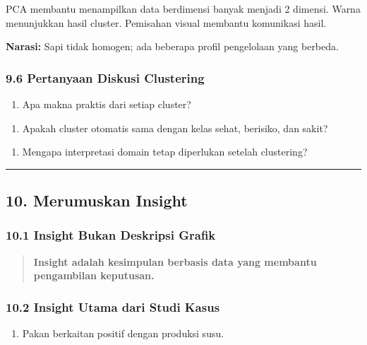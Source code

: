 \documentclass[12pt,a4paper]{article}
\begin{document}
PCA membantu menampilkan data berdimensi banyak menjadi 2 dimensi. Warna menunjukkan hasil cluster. Pemisahan visual membantu komunikasi hasil.


\textbf{Narasi:} Sapi tidak homogen; ada beberapa profil pengelolaan yang berbeda.


\subsubsection{9.6 Pertanyaan Diskusi Clustering}

\begin{enumerate}
\item Apa makna praktis dari setiap cluster?
\end{enumerate}

\begin{enumerate}
\item Apakah cluster otomatis sama dengan kelas sehat, berisiko, dan sakit?
\end{enumerate}

\begin{enumerate}
\item Mengapa interpretasi domain tetap diperlukan setelah clustering?
\end{enumerate}


\hrule


\subsection{10. Merumuskan Insight}

\subsubsection{10.1 Insight Bukan Deskripsi Grafik}

\begin{quote}
\textbf{Insight adalah kesimpulan berbasis data yang membantu pengambilan keputusan.}\end{quote}


\subsubsection{10.2 Insight Utama dari Studi Kasus}

\begin{enumerate}
\item Pakan berkaitan positif dengan produksi susu.
\end{enumerate}
\end{document}
